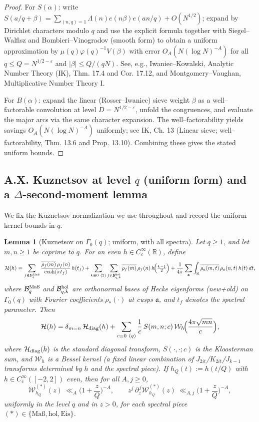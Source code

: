 \documentclass[11pt]{article}
\newtheorem{lemma}{Lemma}[section]
\theoremstyle{definition}
\theoremstyle{remark}
\begin{document}
\begin{proof}
	For $S(\alpha)$: write $S(a/q+\beta)=\sum_{(n,q)=1}\Lambda(n)e(n\beta)e(an/q)+O(N^{1/2})$; expand by Dirichlet characters modulo $q$ and use the explicit formula together with Siegel--Walfisz and Bombieri--Vinogradov (smooth form) to obtain a uniform approximation by $\mu(q)\varphi(q)^{-1}V(\beta)$ with error $O_A(N(\log N)^{-A})$ for all $q\le Q=N^{1/2-\varepsilon}$ and $|\beta|\le Q/(qN)$. See, e.g., Iwaniec--Kowalski, Analytic Number Theory (IK), Thm. 17.4 and Cor. 17.12, and Montgomery--Vaughan, Multiplicative Number Theory I.

	For $B(\alpha)$: expand the linear (Rosser--Iwaniec) sieve weight $\beta$ as a well--factorable convolution at level $D=N^{1/2-\varepsilon}$, unfold the congruences, and evaluate the major arcs via the same character expansion. The well--factorability yields savings $O_A(N(\log N)^{-A})$ uniformly; see IK, Ch. 13 (Linear sieve; well--factorability, Thm. 13.6 and Prop. 13.10). Combining these gives the stated uniform bounds.
\end{proof}

\subsection*{A.X. Kuznetsov at level $q$ (uniform form) and a $\Delta$-second-moment lemma}

We fix the Kuznetsov normalization we use throughout and record the uniform kernel bounds in $q$.

\begin{lemma}[Kuznetsov on $\Gamma_0(q)$; uniform, with all spectra]\label{lem:kuz-uniform}
	Let $q\ge1$, and let $m,n\ge1$ be coprime to $q$. For an even $h\in C_c^\infty(\mathbb R)$, define
	\[
		\mathcal{H}(h)
		=\sum_{f\in\mathcal B_q^{\rm Ma\text\ss}} \frac{\overline{\rho_f(m)}\,\rho_f(n)}{\cosh(\pi t_f)}\,h(t_f)
		+ \sum_{k\equiv0\ (2)} \sum_{f\in\mathcal B_{q,k}^{\rm hol}} \overline{\rho_f(m)}\,\rho_f(n)\,h\!\Big(\tfrac{k-1}{2}\Big)
		+\frac{1}{4\pi}\sum_{\mathfrak a}\int_{\mathbb R}\overline{\rho_{\mathfrak a}(m,t)}\,\rho_{\mathfrak a}(n,t)\,h(t)\,dt,
	\]
	where $\mathcal B_q^{\rm Ma\text\ss}$ and $\mathcal B_{q,k}^{\rm hol}$ are orthonormal bases of Hecke eigenforms (new+old) on $\Gamma_0(q)$ with Fourier coefficients $\rho_*(\cdot)$ at cusps $\mathfrak a$, and $t_f$ denotes the spectral parameter.
	Then
	\[
		\mathcal{H}(h)
		= \delta_{m=n}\,\mathcal H_{\rm diag}(h)
		+ \sum_{\substack{c\equiv 0\ (q)}} \frac{1}{c}\,S(m,n;c)\,\mathcal W_h\!\Big(\frac{4\pi\sqrt{mn}}{c}\Big),
	\]
	where $\mathcal H_{\rm diag}(h)$ is the standard diagonal transform, $S(\cdot,\cdot;c)$ is the Kloosterman sum, and $\mathcal W_h$ is a Bessel kernel (a fixed linear combination of $J_{2it}$/$K_{2it}$/$J_{k-1}$ transforms determined by $h$ and the spectral piece). If $h_Q(t):=h(t/Q)$ with $h\in C_c^\infty([-2,2])$ even, then for all $A,j\ge0$,
	\[
		\mathcal W_{h_Q}^{(*)}(z)\ \ll_A \Big(1+\frac{z}{Q}\Big)^{-A},
		\qquad
		z^j\,\partial_z^{\,j}\mathcal W_{h_Q}^{(*)}(z)\ \ll_{A,j}\Big(1+\frac{z}{Q}\Big)^{-A},
	\]
	uniformly in the level $q$ and in $z>0$, for each spectral piece $(*)\in\{\text{Ma\ss},\text{hol},\text{Eis}\}$.
\end{lemma}
\end{document}

